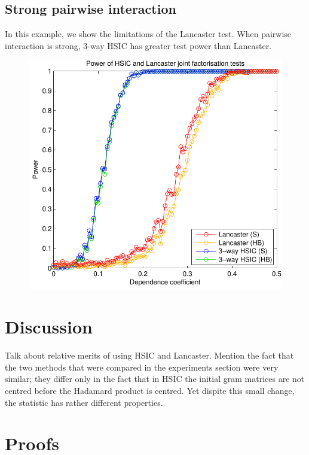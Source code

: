 \documentclass[]{article}
\begin{document}
\subsection{Strong pairwise interaction}
In this example, we show the limitations of the Lancaster test. When pairwise interaction is strong, 3-way HSIC has greater test power than Lancaster.

\begin{figure}[ht]
\vskip 0.2in
\begin{center}
\centerline{\includegraphics[scale=0.6]{UAI_Figure3.pdf}}
\caption{}
\label{Lancaster-sometimes-bad}
\end{center}
\vskip -0.2in
\end{figure} 

\section{Discussion}

Talk about relative merits of using HSIC and Lancaster. Mention the fact that the two methods that were compared in the experiments section were very similar; they differ only in the fact that in HSIC the initial gram matrices are not centred before the Hadamard product is centred. Yet dispite this small change, the statistic has rather different properties.

\section{Proofs}
\end{document}
